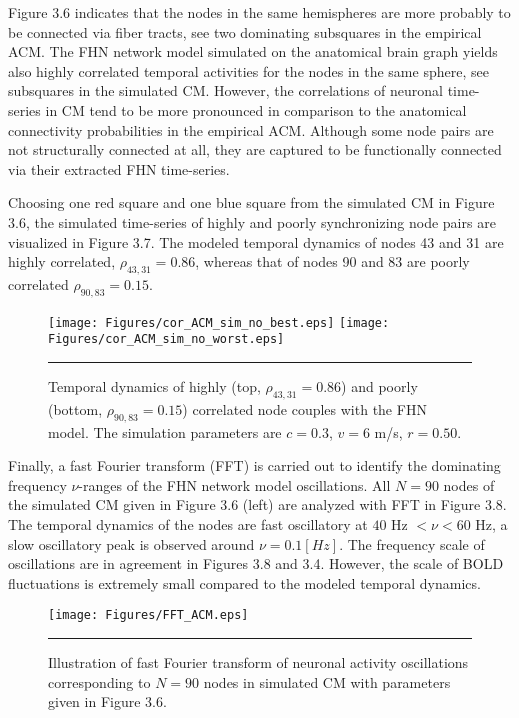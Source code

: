 Figure 3.6 indicates that the nodes in the same hemispheres are more probably to be connected via fiber tracts, see two dominating subsquares in the empirical ACM. The FHN network model simulated on the anatomical brain graph yields also highly correlated temporal activities for the nodes in the same sphere, see subsquares in the simulated CM. However, the correlations of neuronal time-series in CM tend to be more pronounced in comparison to the anatomical connectivity probabilities in the empirical ACM. Although some node pairs are not structurally connected at all, they are captured to be functionally connected via their extracted FHN time-series.  

Choosing one red square and one blue square from the simulated CM in Figure 3.6, the simulated time-series of highly and poorly synchronizing node pairs are visualized in Figure 3.7. The modeled temporal dynamics of nodes 43 and 31 are highly correlated, $\rho_{43,31}=0.86$, whereas that of nodes 90 and 83 are poorly correlated $\rho_{90,83}=0.15$.

\begin{figure}[htbp]
 
  \centering
	 \texttt{[image: Figures/cor\_ACM\_sim\_no\_best.eps]} 
   	 \texttt{[image: Figures/cor\_ACM\_sim\_no\_worst.eps]} 

    \rule{35em}{0.5pt}
  \caption[Neural Activity Node Dynamics, ACM]{ Temporal dynamics of highly (top, $\rho_{43,31}=0.86$) and poorly (bottom, $\rho_{90,83}=0.15$) correlated node couples with the FHN model. The simulation parameters are $c=0.3$, $v=6$ m/s, $r=0.50$.} 
    \label{fig:Neural Activity Node Dynamics, ACM}
 	
\end{figure} 

Finally, a fast Fourier transform (FFT) is carried out to identify the dominating frequency $\nu$-ranges of the FHN network model oscillations. All $N=90$ nodes of the simulated CM given in Figure 3.6 (left) are analyzed with FFT in Figure 3.8. The temporal dynamics of the nodes are fast oscillatory at $40$ Hz $< \nu < 60$ Hz, a slow oscillatory peak is observed around $\nu = 0.1 [Hz]$. The frequency scale of oscillations are in agreement in Figures 3.8 and 3.4. However, the scale of BOLD fluctuations is extremely small compared to the modeled temporal dynamics. 



\begin{figure}[htbp]
 
  \centering
	 \texttt{[image: Figures/FFT\_ACM.eps]} 

    \rule{35em}{0.5pt}
  \caption[3D Fast Fourier Transform, FHN, ACM]{Illustration of fast Fourier transform of neuronal activity oscillations corresponding to $N=90$ nodes in simulated CM with parameters given in Figure 3.6.} 
    \label{fig:3D Fast Fourier Transform, FHN, ACM}
 	
\end{figure}  

